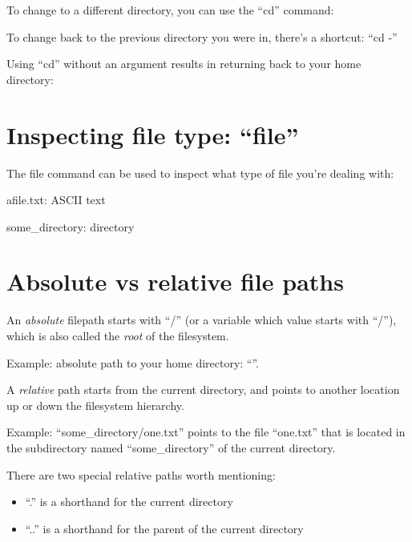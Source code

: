To change to a different directory, you can use the ``cd'' command:

\begin{prompt}
\end{prompt}

To change back to the previous directory you were in, there's a shortcut: ``cd -''

Using ``cd'' without an argument results in returning back to your home directory:

\begin{prompt}
\end{prompt}

\section{Inspecting file type: ``file''}

The file command can be used to inspect what type of file you're dealing with:

\begin{prompt}
afile.txt: ASCII text

some_directory: directory
\end{prompt}

\section{Absolute vs relative file paths}

An \emph{absolute} filepath starts with ``/'' (or a variable which value starts
with ``/''), which is also called the \emph{root} of the filesystem.

Example: absolute path to your home directory:
``\homedir''.

A \emph{relative} path starts from the current directory, and points to another
location up or down the filesystem hierarchy.

Example: ``some\_directory/one.txt'' points to the file ``one.txt'' that is
located in the subdirectory named ``some\_directory'' of the current directory.

There are two special relative paths worth mentioning:

\begin{itemize}
    \item ``.'' is a shorthand for the current directory
    \item ``..'' is a shorthand for the parent of the current directory
\end{itemize}

